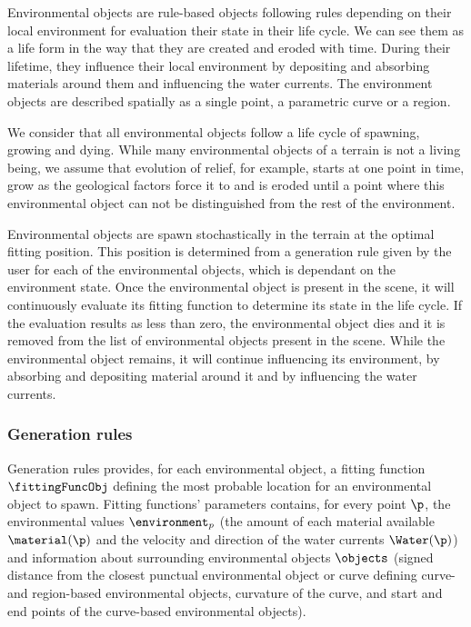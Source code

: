 Environmental objects are rule-based objects following rules depending on their local environment for evaluation their state in their life cycle. We can see them as a life form in the way that they are created and eroded with time. During their lifetime, they influence their local environment by depositing and absorbing materials around them and influencing the water currents. The environment objects are described spatially as a single point, a parametric curve or a region.

We consider that all environmental objects follow a life cycle of spawning, growing and dying. While many environmental objects of a terrain is not a living being, we assume that evolution of relief, for example, starts at one point in time, grow as the geological factors force it to and is eroded until a point where this environmental object can not be distinguished from the rest of the environment. 

Environmental objects are spawn stochastically in the terrain at the optimal fitting position. This position is determined from a generation rule given by the user for each of the environmental objects, which is dependant on the environment state.
Once the environmental object is present in the scene, it will continuously evaluate its fitting function to determine its state in the life cycle. If the evaluation results as less than zero, the environmental object dies and it is removed from the list of environmental objects present in the scene. While the environmental object remains, it will continue influencing its environment, by absorbing and depositing material around it and by influencing the water currents. 

\subsubsection{Generation rules}
\label{sec:semantic-representation_generation-rules}
Generation rules provides, for each environmental object, a fitting function $\fittingFuncObj$ defining the most probable location for an environmental object to spawn. Fitting functions' parameters contains, for every point $\p$, the environmental values $\environment_p$ (the amount of each material available $\material(\p)$ and the velocity and direction of the water currents $\Water(\p)$) and information about surrounding environmental objects $\objects$ (signed distance from the closest punctual environmental object or curve defining curve- and region-based environmental objects, curvature of the curve, and start and end points of the curve-based environmental objects).

